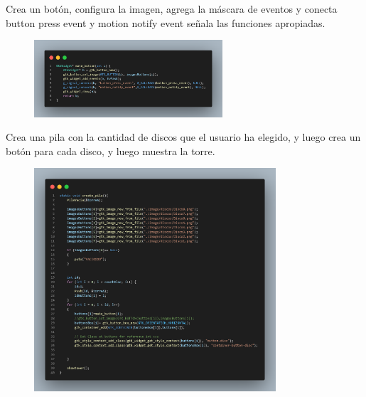 \documentclass[letterpaper,12pt]{extarticle}%
\begin{document}
\begin{multicols}{2}
		Crea un botón, configura la imagen, agrega la máscara de eventos y conecta
		button press event y motion notify event señala las funciones apropiadas.

		\begin{figure}[H]
		\begin{center}
		\includegraphics[width=7cm]{imag//img2.png}
		\caption{}
		\label{decToOct}
		\end{center}
		\end{figure}

		Crea una pila con la cantidad de discos que el usuario ha elegido, y luego
		crea un botón para cada disco, y luego muestra la torre.

		\begin{figure}[H]
			\begin{center}
			\includegraphics[width=9cm]{imag//img4.png}
			\caption{}
			\label{algDecToRest}
			\end{center}
			\end{figure}


\end{multicols}
\end{document}
